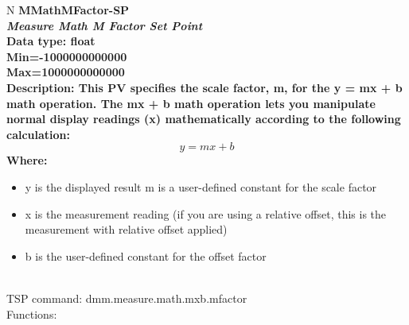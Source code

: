 \documentclass[openany]{article}
\begin{document}
		\begin{tabular}{N}
			\hline
			\bfseries MMathMFactor-SP\label{pv:mmathmfactor-sp} \\ \hline
			\emph{Measure Math M Factor Set Point} \\
			Data type: float \\
			Min=-1000000000000 \\
			Max=1000000000000 \\
			Description: This PV specifies the scale factor, m, for the y = mx + b math operation. The mx + b math operation lets you manipulate normal display readings (x) mathematically according to the following calculation: $$y = mx + b$$ Where: \begin{itemize} \item y is the displayed result  m is a user-defined constant for the scale factor \item x is the measurement reading (if you are using a relative offset, this is the measurement with relative offset applied) \item b is the user-defined constant for the offset factor \end{itemize} \\
			TSP command: dmm.measure.math.mxb.mfactor \\
			Functions: \\
			\arrayrulecolor{\FuncTableBorderColor}

		\end{tabular}
\end{document}
